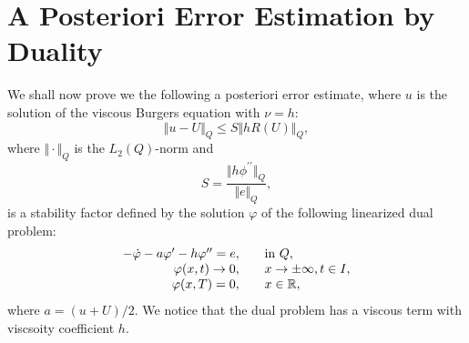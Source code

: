




\section{A Posteriori Error Estimation by Duality}

We shall now prove we the following a posteriori 
error estimate, where $u$ is the solution of the viscous Burgers equation 
with $\nu =h$:
\begin{equation}\label{apostburgers}
\Vert u-U\Vert_{Q}\le S\Vert hR(U)\Vert_{Q},
\end{equation}
where $\Vert\cdot\Vert_Q$ is the $L_2(Q)$-norm and 
\begin{equation}\label{stabburgers}
S=\frac{\Vert h\phi^{\prime\prime}\Vert_{Q}
}{\Vert e\Vert_{Q}},
\end{equation}
is a stability factor defined by the solution 
$\varphi$ of the following 
linearized dual problem:
\begin{equation}\label{burgdual}
\begin{array}{rcl}
 -\dot\varphi - 
a\varphi^\prime -
h\varphi^{\prime\prime}  =  e, & & \mbox{in }Q,\\
\varphi (x,t)  \rightarrow  0, & & x\rightarrow \pm\infty ,t\in I , \\
\varphi (x,T)  =  0,  & & x\in {\mathbb{R}} ,
\end{array}
\end{equation}
{\flushleft where} $a=(u + U)/2$. We notice that the dual problem
has a viscous term with viscsoity coefficient $h$.



